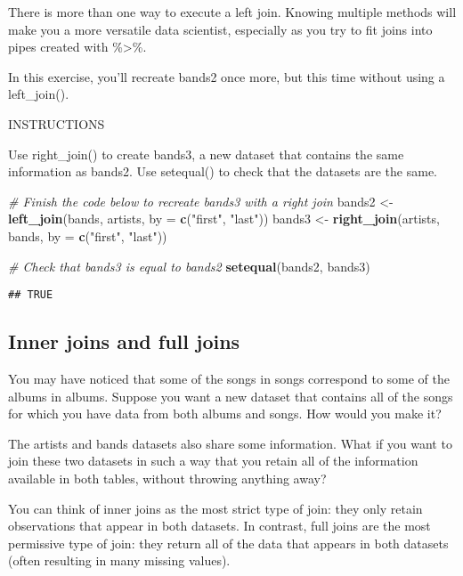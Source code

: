 \documentclass[]{article}
\newenvironment{Shaded}{\begin{snugshade}}{\end{snugshade}}
\newcommand{\KeywordTok}[1]{\textcolor[rgb]{0.13,0.29,0.53}{\textbf{#1}}}
\newcommand{\DataTypeTok}[1]{\textcolor[rgb]{0.13,0.29,0.53}{#1}}
\newcommand{\StringTok}[1]{\textcolor[rgb]{0.31,0.60,0.02}{#1}}
\newcommand{\CommentTok}[1]{\textcolor[rgb]{0.56,0.35,0.01}{\textit{#1}}}
\newcommand{\NormalTok}[1]{#1}
\begin{document}
There is more than one way to execute a left join. Knowing multiple
methods will make you a more versatile data scientist, especially as you
try to fit joins into pipes created with \%\textgreater{}\%.

In this exercise, you'll recreate bands2 once more, but this time
without using a left\_join().

INSTRUCTIONS

Use right\_join() to create bands3, a new dataset that contains the same
information as bands2. Use setequal() to check that the datasets are the
same.

\begin{Shaded}
\begin{Highlighting}[]
\CommentTok{# Finish the code below to recreate bands3 with a right join}
\NormalTok{bands2 <-}\StringTok{ }\KeywordTok{left_join}\NormalTok{(bands, artists, }\DataTypeTok{by =} \KeywordTok{c}\NormalTok{(}\StringTok{"first"}\NormalTok{, }\StringTok{"last"}\NormalTok{))}
\NormalTok{bands3 <-}\StringTok{ }\KeywordTok{right_join}\NormalTok{(artists, bands, }\DataTypeTok{by =} \KeywordTok{c}\NormalTok{(}\StringTok{"first"}\NormalTok{, }\StringTok{"last"}\NormalTok{))}

\CommentTok{# Check that bands3 is equal to bands2}
\KeywordTok{setequal}\NormalTok{(bands2, bands3)}
\end{Highlighting}
\end{Shaded}

\begin{verbatim}
## TRUE
\end{verbatim}

\subsection{Inner joins and full
joins}\label{inner-joins-and-full-joins}

You may have noticed that some of the songs in songs correspond to some
of the albums in albums. Suppose you want a new dataset that contains
all of the songs for which you have data from both albums and songs. How
would you make it?

The artists and bands datasets also share some information. What if you
want to join these two datasets in such a way that you retain all of the
information available in both tables, without throwing anything away?

You can think of inner joins as the most strict type of join: they only
retain observations that appear in both datasets. In contrast, full
joins are the most permissive type of join: they return all of the data
that appears in both datasets (often resulting in many missing values).
\end{document}

